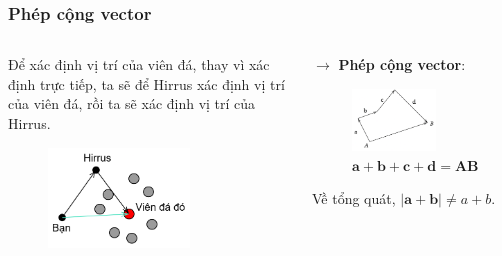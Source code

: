 \begin{frame}
    \frametitle{Phép cộng vector}
    \begin{columns}
    \begin{column}{0.5\textwidth}
        Để xác định vị trí của viên đá, thay vì xác định trực tiếp, ta sẽ để Hirrus xác định vị trí của viên đá, rồi ta sẽ xác định vị trí của Hirrus.
        \begin{figure}
            \centering
            \includegraphics[width=0.7\textwidth]{Slides/Figure/HirrusAndStones.png}
        \end{figure}
    \end{column}
    \begin{column}{0.5\textwidth}
        \(\longrightarrow\) \textbf{Phép cộng vector}:
        \begin{figure}[H]
            \centering
            \includegraphics[width=0.7\textwidth]{Slides/Figure/congvector.png}
            \caption{$\mathbf{a}+\mathbf{b}+\mathbf{c}+\mathbf{d}=\mathbf{AB}$}
        \end{figure}
        Về tổng quát, \(|\mathbf a +\mathbf b| \neq a+b\).
        \end{column}
    \end{columns}
\end{frame}
